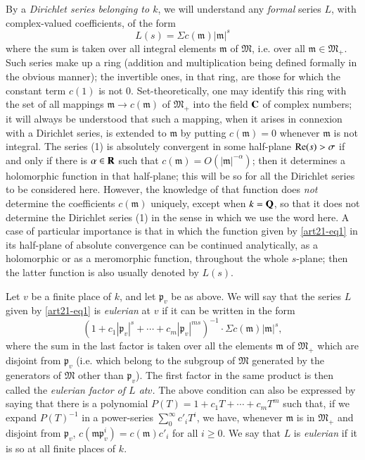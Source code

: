 By a {\em Dirichlet series belonging to $k$}, we will understand any {\em formal} series $L$, with complex-valued coefficients, of the form
\begin{equation*}
L(s)=\Sigma c(\mathfrak{m})|\mathfrak{m}|^{s}\tag{1}\label{art21-eq1}
\end{equation*}
where the sum is taken over all integral elements $\mathfrak{m}$ of $\mathfrak{M}$, i.e. over all $\mathfrak{m}\in \mathfrak{M}_{+}$. Such series make up a ring (addition and multiplication being defined formally in the obvious manner); the invertible ones, in that ring, are those for which the constant term $c(1)$ is not $0$. Set-theoretically, one may identify this ring with the set of all mappings $\mathfrak{m}\to c(\mathfrak{m})$ of $\mathfrak{M}_{+}$ into the field $\mathbf{C}$ of complex numbers; it will always be understood that such a mapping, when it arises in connexion with a Dirichlet series, is extended to $\mathfrak{m}$ by putting $c(\mathfrak{m})=0$ whenever $\mathfrak{m}$ is not integral. The series (1) is absolutely convergent in some half-plane $\operatorname{\mathrm{Re}}(s)>\sigma$ if and only if there is $\alpha\in \mathbf{R}$ such that $c(\mathfrak{m})=O(|\mathfrak{m}|^{-\alpha})$; then it determines a holomorphic function in that half-plane; this will be so for all the Dirichlet series to be considered here. However, the knowledge of that function does {\em not} determine the coefficients $c(\mathfrak{m})$ uniquely, except when $k=\mathbf{Q}$, so that it does not determine the Dirichlet series (1) in the sense in which we use the word here. A case of particular importance is that in which the function given by \eqref{art21-eq1} in its half-plane of absolute convergence can be continued analytically, as a holomorphic or as a meromorphic function, throughout the whole $s$-plane; then the latter function is also usually denoted by $L(s)$.

Let $v$ be a finite place of $k$, and let $\mathfrak{p}_{v}$ be as above. We will say that the series $L$ given by \eqref{art21-eq1} is {\em eulerian} at $v$ if it can be written in the form
$$
(1+c_{1}|\mathfrak{p}_{v}|^{s}+\cdots+c_{m}|\mathfrak{p}_{v}|^{ms})^{-1}\cdot \Sigma c(\mathfrak{m})|\mathfrak{m}|^{s},
$$
where the sum in the last factor is taken over all the elements $\mathfrak{m}$ of $\mathfrak{M}_{+}$ which are disjoint from $\mathfrak{p}_{v}$ (i.e. which belong to the subgroup of $\mathfrak{M}$ generated by the generators of $\mathfrak{M}$ other than $\mathfrak{p}_{v}$). The first factor in the same product is then called the {\em eulerian factor of $L$ at\pageoriginale $v$.} The above condition can also be expressed by saying that there is a polynomial $P(T)=1+c_{1}T+\cdots+c_{m}T^{m}$ such that, if we expand $P(T)^{-1}$ in a power-series $\sum\limits^{\infty}_{0}c'_{i}T^{i}$, we have, whenever $\mathfrak{m}$ is in $\mathfrak{M}_{+}$ and disjoint from $\mathfrak{p}_{v}$, $c(\mathfrak{m}\mathfrak{p}^{i}_{v})=c(\mathfrak{m})c'_{i}$ for all $i\geq 0$. We say that $L$ is {\em eulerian} if it is so at all finite places of $k$.

